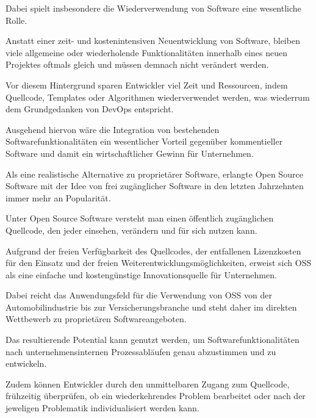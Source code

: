 Dabei spielt insbesondere die Wiederverwendung von Software eine wesentliche Rolle.

Anstatt einer zeit- und kostenintensiven Neuentwicklung von Software, bleiben viele allgemeine oder wiederholende Funktionalitäten innerhalb eines neuen Projektes oftmals gleich und müssen demnach nicht verändert werden.

Vor diesem Hintergrund sparen Entwickler viel Zeit und Ressourcen, indem Quellcode, Templates oder Algorithmen wiederverwendet werden, was wiederrum dem Grundgedanken von DevOps entspricht. 

Ausgehend hiervon wäre die Integration von bestehenden Softwarefunktionalitäten ein wesentlicher Vorteil gegenüber kommentieller Software und damit ein wirtschaftlicher Gewinn für Unternehmen. 

Als eine realistische Alternative zu proprietärer Software, erlangte Open Source Software mit der Idee von frei zugänglicher Software in den letzten Jahrzehnten immer mehr an Popularität.\cite[S. 21,22]{allmann_open_2019} 

Unter Open Source Software versteht man einen öffentlich zugänglichen Quellcode, den jeder einsehen, verändern und für sich nutzen kann.

Aufgrund der freien Verfügbarkeit des Quellcodes, der entfallenen Lizenzkosten für den Einsatz und der freien Weiterentwicklungsmöglichkeiten, erweist sich OSS als eine einfache und kostengünstige Innovationsquelle für Unternehmen.  

Dabei reicht das Anwendungsfeld für die Verwendung von OSS von der Automobilindustrie bis zur Versicherungsbranche und steht daher im direkten Wettbewerb zu proprietären Softwareangeboten.\cite{bitkom_ev_open_nodate}

Das resultierende Potential kann genutzt werden, um Softwarefunktionalitäten nach unternehmensinternen Prozessabläufen genau abzustimmen und zu entwickeln.

Zudem können Entwickler durch den unmittelbaren Zugang zum Quellcode, frühzeitig überprüfen, ob ein wiederkehrendes Problem bearbeitet oder nach der jeweligen Problematik individualisiert werden kann.

